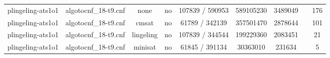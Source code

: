 \begin{appendices}
\begin{table}[p]
\begin{center}
\begin{tabular}{l|cccccccc}
  plingeling-ats1o1              & algotocnf\_18-t9.cnf           & none       & no    & 107839 / 590953 & 589105230 & 3489049   &            & 176 \\ %
  plingeling-ats1o1              & algotocnf\_18-t9.cnf           & cmsat      & no    & 61789 / 342139 & 357501470 & 2878644   &            & 101 \\ %
  plingeling-ats1o1              & algotocnf\_18-t9.cnf           & lingeling  & no    & 107839 / 344544 & 199229360 & 2083451   &            & 21 \\ %
  plingeling-ats1o1              & algotocnf\_18-t9.cnf           & minisat    & no    & 61845 / 391134 & 30363010  & 231634    &            & 5 \\ %
    \end{tabular}
  \end{center}
\end{table}

\newpage


\end{appendices}
